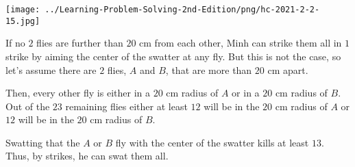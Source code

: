\documentclass{article}
\begin{document}
\begin{center}
    \texttt{[image: ../Learning-Problem-Solving-2nd-Edition/png/hc-2021-2-2-15.jpg]}
\end{center}

\begin{soln}
    If no $2$ flies are further than $20$ cm from each other,
    Minh can strike them all in $1$ strike by aiming the center of the swatter at any fly. 
    But this is not the case, so let's assume there are $2$ flies, $A$ and $B$, that are more than $20$ cm apart.

    Then, every other fly is either in a $20$ cm radius of $A$ or in a $20$ cm radius of $B.$
    Out of the $23$ remaining flies either at least $12$ will be in the $20$ cm radius of $A$
    or $12$ will be in the $20$ cm radius of $B$.

    Swatting that the $A$ or $B$ fly with the center of the swatter kills at least $13$.
    Thus, by  strikes, he can swat them all.
\end{soln}
\end{document}
